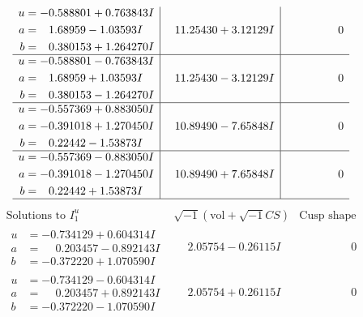 \documentclass[1p]{elsarticle_modified}
\theoremstyle{definition}
\newcommand{\I}{\sqrt{-1}}
\begin{document}
$$\begin{array}{c|c|c}
\begin{aligned}
u &= -0.588801 + 0.763843 I \\
a &= \phantom{-}1.68959 - 1.03593 I \\
b &= \phantom{-}0.380153 + 1.264270 I\end{aligned}
 & \phantom{-}11.25430 + 3.12129 I & \phantom{-0.000000 } 0 \\ \hline\begin{aligned}
u &= -0.588801 - 0.763843 I \\
a &= \phantom{-}1.68959 + 1.03593 I \\
b &= \phantom{-}0.380153 - 1.264270 I\end{aligned}
 & \phantom{-}11.25430 - 3.12129 I & \phantom{-0.000000 } 0 \\ \hline\begin{aligned}
u &= -0.557369 + 0.883050 I \\
a &= -0.391018 + 1.270450 I \\
b &= \phantom{-}0.22442 - 1.53873 I\end{aligned}
 & \phantom{-}10.89490 - 7.65848 I & \phantom{-0.000000 } 0 \\ \hline\begin{aligned}
u &= -0.557369 - 0.883050 I \\
a &= -0.391018 - 1.270450 I \\
b &= \phantom{-}0.22442 + 1.53873 I\end{aligned}
 & \phantom{-}10.89490 + 7.65848 I & \phantom{-0.000000 } 0\\
 \hline 
 \end{array}$$\newpage$$\begin{array}{c|c|c}  
\text{Solutions to }I^u_{1}& \I (\text{vol} + \sqrt{-1}CS) & \text{Cusp shape}\\
 \hline 
\begin{aligned}
u &= -0.734129 + 0.604314 I \\
a &= \phantom{-}0.203457 - 0.892143 I \\
b &= -0.372220 + 1.070590 I\end{aligned}
 & \phantom{-}2.05754 - 0.26115 I & \phantom{-0.000000 } 0 \\ \hline\begin{aligned}
u &= -0.734129 - 0.604314 I \\
a &= \phantom{-}0.203457 + 0.892143 I \\
b &= -0.372220 - 1.070590 I\end{aligned}
 & \phantom{-}2.05754 + 0.26115 I & \phantom{-0.000000 } 0 \\ \hline\begin{aligned}

\end{aligned}
\end{array}$$
\end{document}
